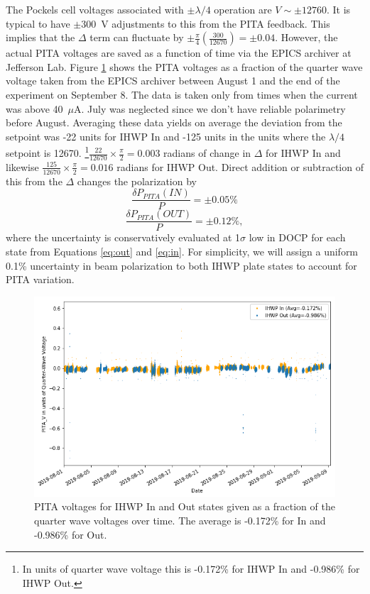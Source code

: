 \documentclass[12pt]{article}
\begin{document}
The Pockels cell voltages associated with $\pm\lambda/4$ operation are $V\sim\pm12760$. It is typical to have $\pm300$~V adjustments to this from the PITA feedback. This implies that the $\Delta$ term can fluctuate by $\pm\frac{\pi}{4}\left(\frac{300}{12670}\right)=\pm0.04$. However, the actual PITA voltages are saved as a function of time via the EPICS archiver at Jefferson Lab.  Figure \ref{fig:pitavst} shows the PITA voltages as a fraction of the quarter wave voltage taken from the EPICS archiver between August 1 and the end of the experiment on September 8. The data is taken only from times when the current was above 40~$\mu$A. July was neglected since we don't have reliable polarimetry before August. Averaging these data yields on average the deviation from the setpoint was -22 units for IHWP In and -125 units in the units where the $\lambda/4$ setpoint is 12670. \footnote{In units of quarter wave voltage this is -0.172\% for IHWP In and -0.986\% for IHWP Out.}$\frac{22}{12670}\times\frac{\pi}{2}=0.003$ radians of change in $\Delta$ for IHWP In and likewise $\frac{125}{12670}\times\frac{\pi}{2}=0.016$ radians for IHWP Out. Direct addition or subtraction of this from the $\Delta$ changes the polarization by
\begin{equation}
\label{eq:pin}
\frac{\delta P_{PITA}(IN)}{P}=\pm0.05\%
\end{equation}
\begin{equation}
\label{eq:pout}
\frac{\delta P_{PITA}(OUT)}{P}=\pm0.12\%,
\end{equation}
where the uncertainty is conservatively evaluated at 1$\sigma$ low in DOCP for each state from Equations \ref{eq:out} and \ref{eq:in}. For simplicity, we will assign a uniform 0.1\% uncertainty in beam polarization to both IHWP plate states to account for PITA variation. 
\begin{figure}
\centering
\includegraphics[width=1\textwidth]{pitavst.png}
\caption{\label{fig:pitavst}PITA voltages for IHWP In and Out states given as a fraction of the quarter wave voltages over time. The average is -0.172\% for In and -0.986\% for Out.}
\end{figure}
\end{document}
